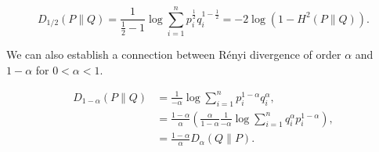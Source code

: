 \begin{equation*}
	D_{1/2}(P \| Q) = \frac{1}{\frac{1}{2}-1} \log \sum_{i=1}^{n} p_i^\frac{1}{2} q_i^{1-\frac{1}{2}} = - 2 \log (1-H^2(P\|Q)).
\end{equation*}

We can also establish a connection between Rényi divergence of order $\alpha$ and $1-\alpha$ for $0 < \alpha < 1$.

\begin{align*}
	D_{1-\alpha}(P \| Q) &= \frac{1}{-\alpha} \log \sum_{i=1}^{n} p_i^{1-\alpha} q_i^{\alpha}, \\
	&=\frac{1-\alpha}{\alpha} \left( \frac{\alpha}{1-\alpha}  \frac{1}{-\alpha} \log \sum_{i=1}^{n} q_i^{\alpha} p_i^{1-\alpha} \right), \\
	&= \frac{1-\alpha}{\alpha} D_{\alpha}(Q \| P).
\end{align*}

